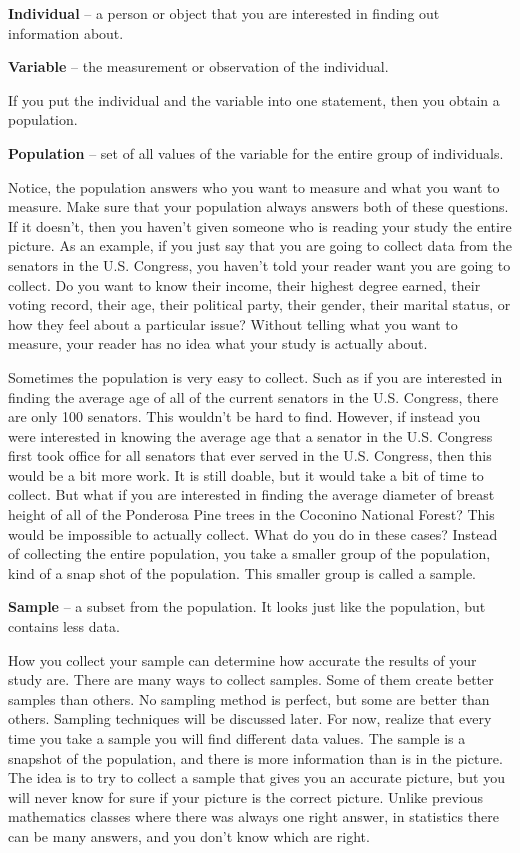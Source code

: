 \documentclass[]{book}
\begin{document}
\textbf{Individual} -- a person or object that you are interested in finding out information about.

\textbf{Variable} -- the measurement or observation of the individual.

If you put the individual and the variable into one statement, then you obtain a population.

\textbf{Population} -- set of all values of the variable for the entire group of individuals.

Notice, the population answers who you want to measure and what you want to measure. Make sure that your population always answers both of these questions. If it doesn't, then you haven't given someone who is reading your study the entire picture. As an example, if you just say that you are going to collect data from the senators in the U.S. Congress, you haven't told your reader want you are going to collect. Do you want to know their income, their highest degree earned, their voting record, their age, their political party, their gender, their marital status, or how they feel about a particular issue? Without telling what you want to measure, your reader has no idea what your study is actually about.

Sometimes the population is very easy to collect. Such as if you are interested in finding the average age of all of the current senators in the U.S. Congress, there are only 100 senators. This wouldn't be hard to find. However, if instead you were interested in knowing the average age that a senator in the U.S. Congress first took office for all senators that ever served in the U.S. Congress, then this would be a bit more work. It is still doable, but it would take a bit of time to collect. But what if you are interested in finding the average diameter of breast height of all of the Ponderosa Pine trees in the Coconino National Forest? This would be impossible to actually collect. What do you do in these cases? Instead of collecting the entire population, you take a smaller group of the population, kind of a snap shot of the population. This smaller group is called a sample.

\textbf{Sample} -- a subset from the population. It looks just like the population, but contains less data.

How you collect your sample can determine how accurate the results of your study are. There are many ways to collect samples. Some of them create better samples than others. No sampling method is perfect, but some are better than others. Sampling techniques will be discussed later. For now, realize that every time you take a sample you will find different data values. The sample is a snapshot of the population, and there is more information than is in the picture. The idea is to try to collect a sample that gives you an accurate picture, but you will never know for sure if your picture is the correct picture. Unlike previous mathematics classes where there was always one right answer, in statistics there can be many answers, and you don't know which are right.
\end{document}
